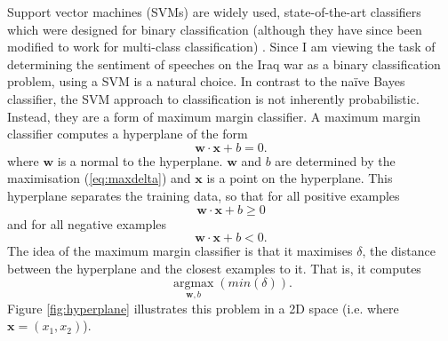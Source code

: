 \documentclass[12pt,a4paper,twoside,openright]{report}
\begin{document}
Support vector machines (SVMs) are widely used, state-of-the-art classifiers which were designed for binary classification (although they have since been modified to work for multi-class classification) \cite{ml_book}. Since I am viewing the task of determining the sentiment of speeches on the Iraq war as a binary classification problem, using a SVM is a natural choice.
\newline
\newline
In contrast to the na\"{i}ve Bayes classifier, the SVM approach to classification is not inherently probabilistic. Instead, they are a form of maximum margin classifier. A maximum margin classifier computes a hyperplane of the form
\begin{equation} \label{eq:hyperplane}
	\mathbf{w} \cdot \mathbf{x} + b = 0.
\end{equation}
where $\mathbf{w}$ is a normal to the hyperplane. $\mathbf{w}$ and $b$ are determined by the maximisation (\ref{eq:maxdelta}) and $\mathbf{x}$ is a point on the hyperplane. This hyperplane separates the training data, so that for all positive examples
\begin{equation}
\mathbf{w} \cdot \mathbf{x} + b \ge 0
\end{equation}
and for all negative examples
\begin{equation}
\mathbf{w} \cdot \mathbf{x} + b < 0.
\end{equation}
The idea of the maximum margin classifier is that it maximises $\delta$, the distance between the hyperplane and the closest examples to it. That is, it computes
\begin{equation} \label{eq:maxdelta}
	\underset{\mathbf{w}, b}{\operatorname{argmax}}(min(\delta)).
\end{equation}
Figure \ref{fig:hyperplane} illustrates this problem in a 2D space (i.e. where $\mathbf{x} = (x_1, x_2)$).
\end{document}
